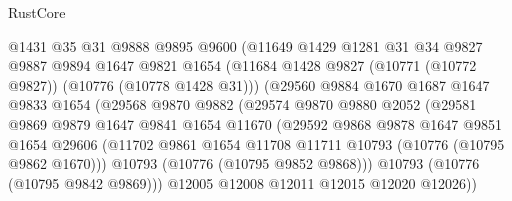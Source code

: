 \begin{lexlean}{RustCore}
\begin{coremodule}
                          @1431
                          @35
                          @31
                          @9888
                          @9895
                          @9600
                          (@11649
                            @1429
                            @1281
                            @31
                            @34
                            @9827
                            @9887
                            @9894
                            @1647
                            @9821
                            @1654
                            (@11684 @1428 @9827 (@10771 (@10772 @9827)) (@10776 (@10778 @1428 @31)))
                            (@29560
                              @9884
                              @1670
                              @1687
                              @1647
                              @9833
                              @1654
                              (@29568
                                @9870
                                @9882
                                (@29574
                                  @9870
                                  @9880
                                  @2052
                                  (@29581
                                    @9869
                                    @9879
                                    @1647
                                    @9841
                                    @1654
                                    @11670
                                    (@29592
                                      @9868
                                      @9878
                                      @1647
                                      @9851
                                      @1654
                                      @29606
                                      (@11702
                                        @9861
                                        @1654
                                        @11708
                                        @11711
                                        @10793
                                        (@10776 (@10795 @9862 @1670)))
                                      @10793
                                      (@10776 (@10795 @9852 @9868)))
                                    @10793
                                    (@10776 (@10795 @9842 @9869)))
                                  @12005
                                  @12008
                                  @12011
                                  @12015
                                  @12020
                                  @12026))

\end{coremodule}
\end{lexlean}
